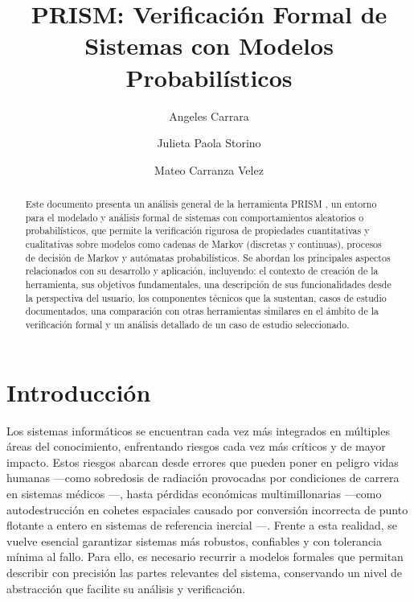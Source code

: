 \documentclass[runningheads]{llncs}
\begin{document}
\title{PRISM: Verificación Formal de Sistemas con Modelos Probabilísticos}

\author{
    Angeles Carrara\and
    Julieta Paola Storino\and
    Mateo Carranza Velez}



\maketitle

\begin{abstract}
Este documento presenta un análisis general de la herramienta PRISM \cite{KNP11}, un entorno para el modelado y análisis formal de sistemas con comportamientos aleatorios o probabilísticos, que permite la verificación rigurosa de propiedades cuantitativas y cualitativas sobre modelos como cadenas de Markov (discretas y continuas), procesos de decisión de Markov y autómatas probabilísticos. Se abordan los principales aspectos relacionados con su desarrollo y aplicación, incluyendo: el contexto de creación de la herramienta, sus objetivos fundamentales, una descripción de sus funcionalidades desde la perspectiva del usuario, los componentes técnicos que la sustentan, casos de estudio documentados, una comparación con otras herramientas similares en el ámbito de la verificación formal y un análisis detallado de un caso de estudio seleccionado.
\end{abstract}

\section{Introducción}
Los sistemas informáticos se encuentran cada vez más integrados en múltiples áreas del conocimiento, enfrentando riesgos cada vez más críticos y de mayor impacto. Estos riesgos abarcan desde errores que pueden poner en peligro vidas humanas —como sobredosis de radiación provocadas por condiciones de carrera en sistemas médicos \cite{LT93}—, hasta pérdidas económicas multimillonarias —como autodestrucción en cohetes espaciales causado por conversión incorrecta de punto flotante a entero en sistemas de referencia inercial \cite{Lan96}—. Frente a esta realidad, se vuelve esencial garantizar sistemas más robustos, confiables y con tolerancia mínima al fallo. Para ello, es necesario recurrir a modelos formales que permitan describir con precisión las partes relevantes del sistema, conservando un nivel de abstracción que facilite su análisis y verificación.
\end{document}
